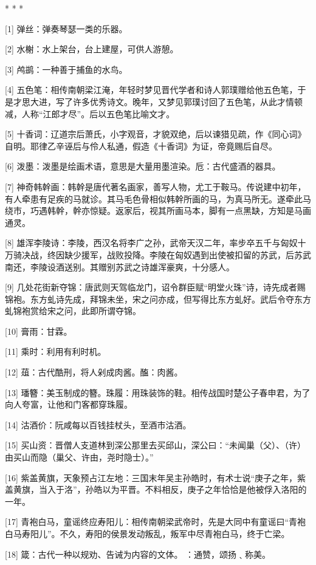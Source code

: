 \documentclass[12pt,UTF8]{ctexbook}
\begin{document}
* * *



[1] 弹丝：弹奏琴瑟一类的乐器。

[2] 水榭：水上架台，台上建屋，可供人游憩。

[3] 鸬鹚：一种善于捕鱼的水鸟。

[4] 五色笔：相传南朝梁江淹，年轻时梦见晋代学者和诗人郭璞赠给他五色笔，于是才思大进，写了许多优秀诗文。晚年，又梦见郭璞讨回了五色笔，从此才情顿减，人称“江郎才尽”。后以五色笔比喻文才。

[5] 十香词：辽道宗后萧氏，小字观音，才貌双绝，后以谏猎见疏，作《同心词》自明。耶律乙辛诬后与伶人私通，假造《十香词》为证，帝竟赐后自尽。

[6] 泼墨：泼墨是绘画术语，意思是大量用墨渲染。卮：古代盛酒的器具。

[7] 神奇韩幹画：韩幹是唐代著名画家，善写人物，尤工于鞍马。传说建中初年，有人牵患有足疾的马就诊。其马毛色骨相似韩幹所画的马，为真马所无。遂牵此马绕市，巧遇韩幹，幹亦惊疑。返家后，视其所画马本，脚有一点黑缺，方知是马画通灵。

[8] 雄浑李陵诗：李陵，西汉名将李广之孙，武帝天汉二年，率步卒五千与匈奴十万骑决战，终因缺少援军，战败投降。李陵在匈奴遇到出使被扣留的苏武，后苏武南还，李陵设酒送别。其赠别苏武之诗雄浑豪爽，十分感人。

[9] 几处花街新夺锦：唐武则天驾临龙门，诏令群臣赋“明堂火珠”诗，诗先成者赐锦袍。东方虬诗先成，拜锦未坐，宋之问亦成，但写得比东方虬好。武后令夺东方虬锦袍赏给宋之问，此即所谓夺锦。

[10] 膏雨：甘霖。

[11] 乘时：利用有利时机。

[12] 葅：古代酷刑，将人剁成肉酱。醢：肉酱。

[13] 璠簪：美玉制成的簪。珠履：用珠装饰的鞋。相传战国时楚公子春申君，为了向人夸富，让他和门客都穿珠履。

[14] 沽酒价：阮咸每以百钱挂杖头，至酒市沽酒。

[15] 买山资：晋僧人支道林到深公那里去买邱山，深公曰：“未闻巢（父）、（许）由买山而隐（巢父、许由，尧时隐士）。”

[16] 紫盖黄旗，天象预占江左地：三国末年吴主孙皓时，有术士说“庚子之年，紫盖黄旗，当入于洛”，孙皓以为平晋。不料相反，庚子之年恰恰是他被俘入洛阳的一年。

[17] 青袍白马，童谣终应寿阳儿：相传南朝梁武帝时，先是大同中有童谣曰“青袍白马寿阳儿”。不久，寿阳的侯景发动叛乱，叛军中尽青袍白马，终于亡梁。

[18] 箴：古代一种以规劝、告诫为内容的文体。 ：通赞，颂扬﹑称美。
\end{document}
